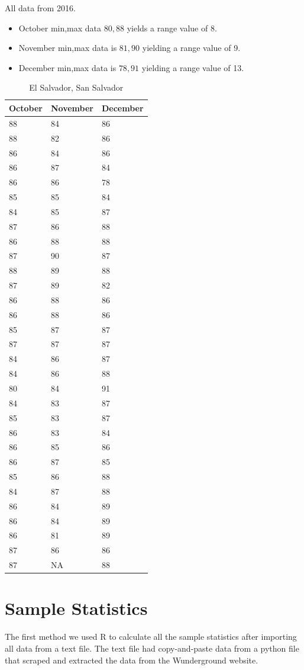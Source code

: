\documentclass[12pt]{amsart} \usepackage{amscd} \usepackage{epsfig}
\begin{document}
All data from 2016.
\begin{itemize}
\item October min,max data $80,88$ yields a range value of 8.
\item November min,max data is $81,90$ yielding a range value of 9.
\item December min,max data is $78,91$ yielding a range value of 13.
\end{itemize}


\begin{table}[H]
\centering
\caption{El Salvador, San Salvador}
\begin{tabular}{lll}
\hline \hline
October & November & December \\
\hline
88 & 84 & 86 \\
88 & 82 & 86 \\
86 & 84 & 86 \\
86 & 87 & 84 \\
86 & 86 & 78 \\
85 & 85 & 84 \\
84 & 85 & 87 \\
87 & 86 & 88 \\
86 & 88 & 88 \\
87 & 90 & 87 \\
88 & 89 & 88 \\
87 & 89 & 82 \\
86 & 88 & 86 \\
86 & 88 & 86 \\
85 & 87 & 87 \\
87 & 87 & 87 \\
84 & 86 & 87 \\
84 & 86 & 88 \\
80 & 84 & 91 \\
84 & 83 & 87 \\
85 & 83 & 87 \\
86 & 83 & 84 \\
86 & 85 & 86 \\
86 & 87 & 85 \\
85 & 86 & 88 \\
84 & 87 & 88 \\
86 & 84 & 89 \\
86 & 84 & 89 \\
86 & 81 & 89 \\
87 & 86 & 86 \\
87 & NA & 88
\end{tabular}
\end{table}

\section*{Sample Statistics}
The first method we used R to calculate all the sample statistics
after importing all data from a text file.  The text file had
copy-and-paste data from a python file that scraped and extracted the
data from the Wunderground website.
\end{document}

